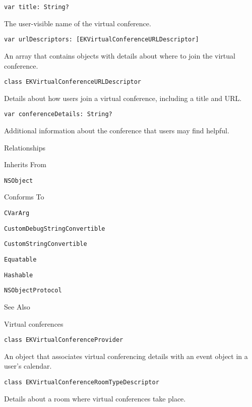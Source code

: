 \documentclass{article}
\begin{document}
\texttt{var title: String?}

The user-visible name of the virtual conference.

\texttt{var urlDescriptors: [EKVirtualConferenceURLDescriptor]}

An array that contains objects with details about where to join the virtual conference.

\texttt{class EKVirtualConferenceURLDescriptor}

Details about how users join a virtual conference, including a title and URL.

\texttt{var conferenceDetails: String?}

Additional information about the conference that users may find helpful.

Relationships

Inherits From

\texttt{NSObject}

Conforms To

\texttt{CVarArg}

\texttt{CustomDebugStringConvertible}

\texttt{CustomStringConvertible}

\texttt{Equatable}

\texttt{Hashable}

\texttt{NSObjectProtocol}

See Also

Virtual conferences

\texttt{class EKVirtualConferenceProvider}

An object that associates virtual conferencing details with an event object in a user's calendar.

\texttt{class EKVirtualConferenceRoomTypeDescriptor}

Details about a room where virtual conferences take place.

\newpage
\end{document}
